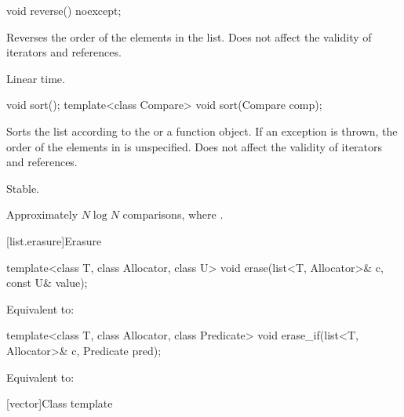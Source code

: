 %
\begin{itemdecl}
void reverse() noexcept;
\end{itemdecl}

\begin{itemdescr}
\pnum
\effects
Reverses the order of the elements in the list.
Does not affect the validity of iterators and references.

\pnum
\complexity
Linear time.
\end{itemdescr}

%
\begin{itemdecl}
void sort();
template<class Compare> void sort(Compare comp);
\end{itemdecl}

\begin{itemdescr}
\pnum
\effects
Sorts the list according to the  or a  function object.
If an exception is thrown,
the order of the elements in  is unspecified.
Does not affect the validity of iterators and references.

\pnum
\remarks
Stable.

\pnum
\complexity
Approximately
$N \log N$
comparisons, where
.
\end{itemdescr}

[list.erasure]{Erasure}

%
\begin{itemdecl}
template<class T, class Allocator, class U>
  void erase(list<T, Allocator>& c, const U& value);
\end{itemdecl}

\begin{itemdescr}
\pnum
\effects
Equivalent to: 
\end{itemdescr}

%
\begin{itemdecl}
template<class T, class Allocator, class Predicate>
  void erase_if(list<T, Allocator>& c, Predicate pred);
\end{itemdecl}

\begin{itemdescr}
\pnum
\effects
Equivalent to: 
\end{itemdescr}

[vector]{Class template }

